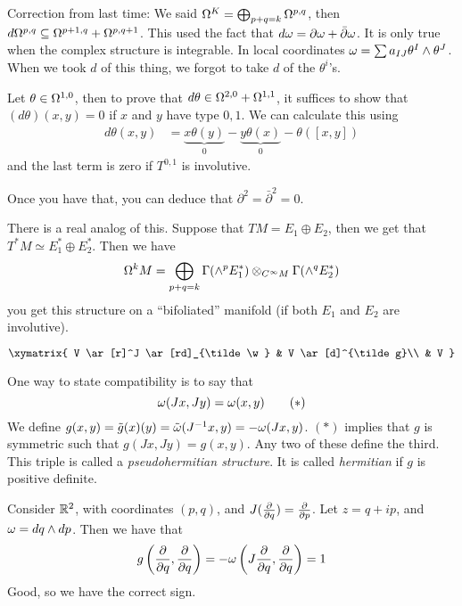  \setcounter{lecture}{9}

 Correction from last time:  We said $\Omega^K = \bigoplus_{p+q=k}
 \Omega^{p,q}$, then $d\Omega^{p,q} \subseteq \Omega^{p+1,q}+\Omega^{p,q+1}$.
 This used the fact that $d\omega = \partial \omega + \bar\partial \omega$.
 It is only true when the complex structure is integrable.  In
 local coordinates $\omega = \sum a_{IJ} \theta^I\wedge \theta^J$.
 When we took $d$ of this thing, we forgot to take $d$ of the
 $\theta^i$'s.

 Let $\theta\in \Omega^{1,0}$, then to prove that $d\theta\in
 \Omega^{2,0}+\Omega^{1,1}$, it suffices to show that $(d\theta)(x,y)=0$
 if $x$ and $y$ have type $0,1$.  We can calculate this using
 \begin{align*}
   d\theta(x,y) &= \underbrace{x\theta(y)}_0 - \underbrace{y\theta(x)}_0 - \theta([x,y])
 \end{align*}
 and the last term is zero if $T^{0,1}$ is involutive.

 Once you have that, you can deduce that
 $\partial^2=\bar\partial^2=0$.

 There is a real analog of this.  Suppose that $TM=E_1\oplus E_2$,
 then we get that $T^*M\simeq E^*_1\oplus E^*_2$.  Then we have
 \[
    \Omega^kM = \bigoplus_{p+q=k} \Gamma(\wedge^p
    E^*_1)\otimes_{C^\infty M}
    \Gamma(\wedge^q E^*_2)
 \]
 you get this structure on a ``bifoliated'' manifold (if both
 $E_1$ and $E_2$ are involutive).

 \vspace{5mm}

 \[\xymatrix{
  V \ar[r]^J \ar[rd]_{\tilde \w} & V \ar[d]^{\tilde g}\\
  & V
 }\]

 One way to state compatibility is to say that
 \begin{equation*}
 \omega(Jx,Jy)=\omega(x,y) \tag{$\ast$}
 \end{equation*}
 We define $g(x,y)=\tilde g(x)(y) = \tilde {\omega}(J^{-1}x,y) =
 -\omega(Jx,y)$.  $(\ast)$ implies that $g$ is symmetric such that
 $g(Jx,Jy)=g(x,y)$.  Any two of these define the third.  This
 triple is called a \emph{pseudohermitian structure}.  It is
 called \emph{hermitian} if $g$ is positive definite.

 Consider $\mathbb{R}^2$, with coordinates $(p,q)$, and
 $J(\frac{\partial }{\partial q})=\frac{\partial }{\partial p}$.  Let $z=q+ip$, and $\omega=dq\wedge dp$.
 Then we have that
 \[
   g\left(\frac{\partial }{\partial q},\frac{\partial }{\partial q}\right) = -\omega\left(J\frac{\partial }{\partial q},\frac{\partial }{\partial q}\right) = 1
 \]
 Good, so we have the correct sign.

